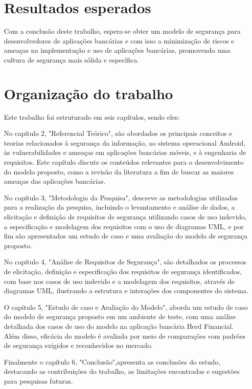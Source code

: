     \section{Resultados esperados} 
    Com a conclusão deste trabalho, espera-se obter um modelo de segurança para desenvolvedores de aplicações bancárias e com isso a minimização de riscos e ameaças na implementação e uso de aplicações bancárias, promovendo uma cultura de segurança mais sólida e específica.

    \section{Organização do trabalho}
    Este trabalho foi estruturado em seis capítulos, sendo eles:  
    
    No capítulo 2, "Referencial Teórico", são abordados os principais conceitos e teorias relacionados à segurança da informação, ao sistema operacional Android, às vulnerabilidades e ameaças em aplicações bancárias móveis, e à engenharia de requisitos. Este capítulo discute os conteúdos relevantes para o desenvolvimento do modelo proposto, como a revisão da literatura a fim de buscar as maiores ameaças das aplicações bancárias. 
    
    No capítulo 3, "Metodologia da Pesquisa", descreve as metodologias utilizadas para a realização da pesquisa, incluindo o levantamento e análise de dados, a elicitação e definição de requisitos de segurança utilizando casos de uso indevido, a especificação e modelagem dos requisitos com o uso de diagramas UML, e por fim são apresentados um estudo de caso e uma avaliação do modelo de segurança proposto.
    
    No capítulo 4, "Análise de Requisitos de Segurança", são detalhados os processos de elicitação, definição e especificação dos requisitos de segurança identificados, com base nos casos de uso indevido e a modelagem dos requisitos, através de diagramas UML, ilustrando a estrutura e interações dos componentes do sistema.
    
    O capítulo 5, "Estudo de caso e Avaliação do Modelo", aborda um estudo de caso do modelo de segurança proposto em um ambiente de teste, com uma análise detalhada dos casos de uso do modelo na aplicação bancária Herd Financial. Além disso, eficácia do modelo é avaliada por meio de comparações com padrões de segurança exigidos e reconhecidos no mercado.
    
    Finalmente o capítulo 6, "Conclusão",apresenta as conclusões do estudo, destacando as contribuições do trabalho, as limitações encontradas e sugestões para pesquisas futuras.

